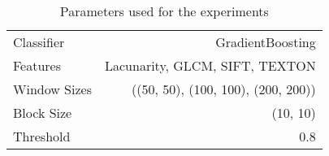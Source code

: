 \begin{table}
    \centering
    \begin{tabular}{lr}
        \hline
        Classifier & GradientBoosting\\
        Features & Lacunarity, GLCM, SIFT, TEXTON\\
        Window Sizes & ((50, 50), (100, 100), (200, 200))\\
        Block Size & (10, 10)\\
        Threshold & 0.8\\
        \hline
    \end{tabular}
    \caption{Parameters used for the experiments}
    \label{tbl:params}
\end{table}
